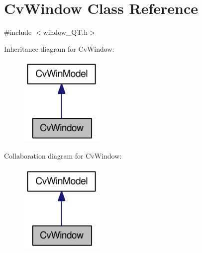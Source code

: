 \hypertarget{classCvWindow}{
\section{CvWindow Class Reference}
\label{classCvWindow}
}


{\ttfamily \#include $<$window\_\-QT.h$>$}



Inheritance diagram for CvWindow:\nopagebreak
\begin{figure}[H]
\begin{center}
\leavevmode
\includegraphics[width=114pt]{classCvWindow__inherit__graph}
\end{center}
\end{figure}


Collaboration diagram for CvWindow:\nopagebreak
\begin{figure}[H]
\begin{center}
\leavevmode
\includegraphics[width=114pt]{classCvWindow__coll__graph}
\end{center}
\end{figure}
